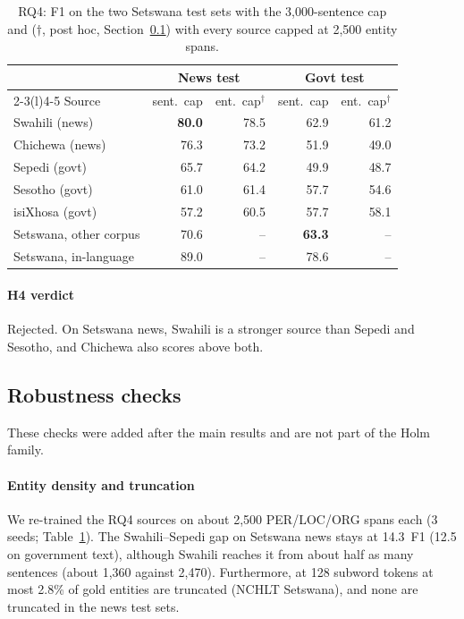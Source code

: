 \begin{table}[t]
\centering\footnotesize
\caption{RQ4: F1 on the two Setswana test sets with the 3,000-sentence cap and ($\dagger$, post hoc, Section~\ref{sec:res-robust}) with every source capped at 2,500 entity spans.}
\label{tab:rq4}
\begin{tabular}{@{}lrrrr@{}}
\toprule
& \multicolumn{2}{c}{News test} & \multicolumn{2}{c}{Govt test}\\
\cmidrule(lr){2-3}\cmidrule(l){4-5}
Source & sent.\ cap & ent.\ cap$^\dagger$ & sent.\ cap & ent.\ cap$^\dagger$\\
\midrule
Swahili (news) & \textbf{80.0} & 78.5 & 62.9 & 61.2\\
Chichewa (news) & 76.3 & 73.2 & 51.9 & 49.0\\
Sepedi (govt) & 65.7 & 64.2 & 49.9 & 48.7\\
Sesotho (govt) & 61.0 & 61.4 & 57.7 & 54.6\\
isiXhosa (govt) & 57.2 & 60.5 & 57.7 & 58.1\\
Setswana, other corpus & 70.6 & -- & \textbf{63.3} & --\\
\midrule
Setswana, in-language & 89.0 & -- & 78.6 & --\\
\bottomrule
\end{tabular}
\end{table}

\paragraph{H4 verdict} Rejected. On Setswana news, Swahili is a stronger source than Sepedi and Sesotho, and Chichewa also scores above both.

\subsection{Robustness checks}\label{sec:res-robust}
These checks were added after the main results and are not part of the Holm family.

\paragraph{Entity density and truncation} We re-trained the RQ4 sources on about 2,500 PER/LOC/ORG spans each (3 seeds; Table~\ref{tab:rq4}). The Swahili--Sepedi gap on Setswana news stays at 14.3~F1 (12.5 on government text), although Swahili reaches it from about half as many sentences (about 1,360 against 2,470). Furthermore, at 128 subword tokens at most 2.8\% of gold entities are truncated (NCHLT Setswana), and none are truncated in the news test sets.

